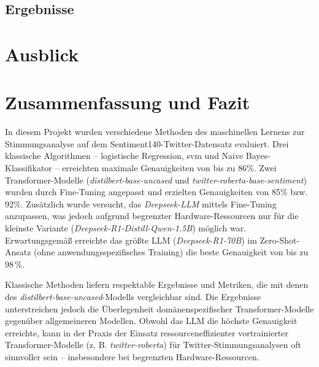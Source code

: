 \documentclass[researchlab,group,]{AIGpaper}
\begin{document}
\subsection{Ergebnisse}

\section{Ausblick}

\section{Zusammenfassung und Fazit}

In diesem Projekt wurden verschiedene Methoden des maschinellen Lernens zur Stimmungsanalyse auf dem Sentiment140-Twitter-Datensatz evaluiert. 
Drei klassische Algorithmen – logistische Regression, \gls{svm} und Naive Bayes-Klassifikator – erreichten maximale Genauigkeiten von bis zu 86\%. 
Zwei Transformer-Modelle (\emph{distilbert-base-uncased} und \emph{twitter-roberta-base-sentiment}) wurden durch Fine-Tuning angepasst und erzielten Genauigkeiten von 85\% bzw. 92\%. 
Zusätzlich wurde versucht, das \emph{Deepseek-LLM} mittels Fine-Tuning anzupassen, was jedoch aufgrund begrenzter Hardware-Ressourcen nur für die kleinste Variante (\emph{Deepseek-R1-Distill-Qwen-1.5B}) möglich war. 
Erwartungsgemäß erreichte das größte LLM (\emph{Deepseek-R1-70B}) im Zero-Shot-Ansatz (ohne anwendungsspezifisches Training) die beste Genauigkeit von bis zu 98\,\%.

Klassische Methoden liefern respektable Ergebnisse und Metriken, die mit denen des \emph{distilbert-base-uncased}-Modells vergleichbar sind. 
Die Ergebnisse unterstreichen jedoch die Überlegenheit domänenspezifischer Transformer-Modelle gegenüber allgemeineren Modellen. 
Obwohl das LLM die höchste Genauigkeit erreichte, kann in der Praxis der Einsatz ressourceneffizienter vortrainierter Transformer-Modelle (z. B. \emph{twitter-roberta}) für Twitter-Stimmungsanalysen oft sinnvoller sein – insbesondere bei begrenzten Hardware-Ressourcen.

\newpage
\addreferences

\end{document}
